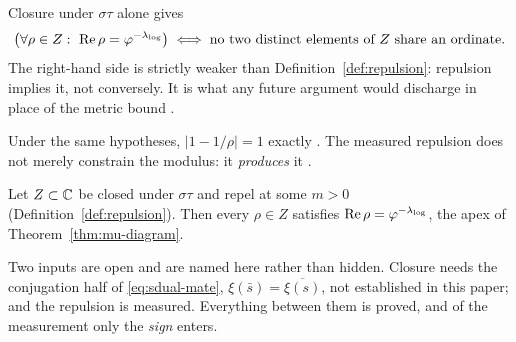 \begin{theorem}\label{thm:weak-form}
Closure under $\sigma\tau$ alone gives
\begin{equation}\label{eq:E-iff-no-sharing}
  \bigl(\forall\rho\in Z:\ \operatorname{Re}\rho=\varphi^{-\lambda_{\log}}\bigr)
  \iff \text{no two distinct elements of } Z \text{ share an ordinate}.
\end{equation}
The right-hand side is strictly weaker than Definition~\ref{def:repulsion}: repulsion implies it,
not conversely. It is what any future argument would discharge in place of the metric bound .
\end{theorem}

\begin{proposition}\label{repulsion_modulus_is_one}
Under the same hypotheses, $\lvert1-1/\rho\rvert=1$ exactly . The measured repulsion does not merely
constrain the modulus: it \emph{produces} it .
\end{proposition}

\begin{theorem}\label{thm:zeros-apex}
Let $Z\subset\mathbb{C}$ be closed under $\sigma\tau$ and repel at some $m>0$
(Definition~\ref{def:repulsion}). Then every $\rho\in Z$ satisfies $\operatorname{Re}\rho=\varphi^{-\lambda_{\log}}$, the
apex of Theorem~\ref{thm:mu-diagram}.

Two inputs are open and are named here rather than hidden. Closure needs the conjugation half of
\eqref{eq:sdual-mate}, $\xi(\bar s)=\overline{\xi(s)}$, not established in this paper; and
the repulsion is measured. Everything between them is proved, and of the measurement only
the \emph{sign} enters.
\end{theorem}

